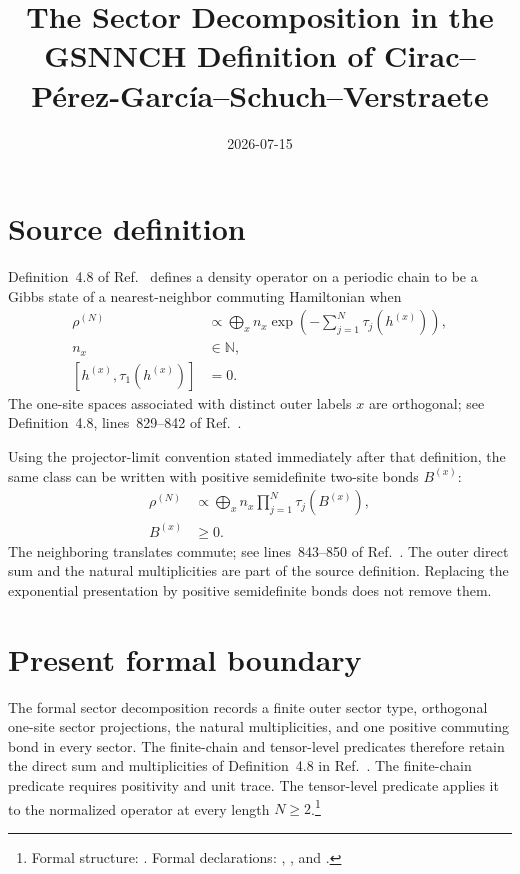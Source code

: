 \documentclass{article}
\title{The Sector Decomposition in the GSNNCH Definition of
Cirac--P\'erez-Garc\'ia--Schuch--Verstraete}
\author{}
\date{2026-07-15}
\begin{document}
\maketitle
{}

\section{Source definition}

Definition~4.8 of Ref.~\cite{Cirac2016MPDO_arXiv} defines a density operator
on a periodic chain to be a Gibbs state of a nearest-neighbor commuting
Hamiltonian when
\begin{align}
    \rho^{(N)}
        &\propto
        \bigoplus_x n_x
        \exp\left(-\sum_{j=1}^N\tau_j(h^{(x)})\right),
    \label{eq:cpsv16_gsnnch_sector_decomposition_source_exponential_form}\\
    n_x
        &\in\mathbb N,
    \label{eq:cpsv16_gsnnch_sector_decomposition_source_natural_multiplicity}\\
    [h^{(x)},\tau_1(h^{(x)})]
        &=0.
    \label{eq:cpsv16_gsnnch_sector_decomposition_source_local_commutation}
\end{align}
The one-site spaces associated with distinct outer labels $x$ are orthogonal;
see Definition~4.8, lines~829--842 of
Ref.~\cite{Cirac2016MPDO_arXiv}.

Using the projector-limit convention stated immediately after that definition,
the same class can be written with positive semidefinite two-site bonds
$B^{(x)}$:
\begin{align}
    \rho^{(N)}
        &\propto
        \bigoplus_x n_x
        \prod_{j=1}^N\tau_j(B^{(x)}),
    \label{eq:cpsv16_gsnnch_sector_decomposition_source_bond_product_form}\\
    B^{(x)}
        &\geq0.
    \label{eq:cpsv16_gsnnch_sector_decomposition_source_positive_bond}
\end{align}
The neighboring translates commute; see lines~843--850 of
Ref.~\cite{Cirac2016MPDO_arXiv}. The outer direct sum and the natural
multiplicities are part of the source definition. Replacing the exponential
presentation by positive semidefinite bonds does not remove them.

\section{Present formal boundary}

The formal sector decomposition records a finite outer sector type, orthogonal
one-site sector projections, the natural multiplicities, and one positive
commuting bond in every sector. The finite-chain and tensor-level predicates
therefore retain the direct sum and multiplicities of Definition~4.8 in
Ref.~\cite{Cirac2016MPDO_arXiv}. The finite-chain predicate requires positivity
and unit trace. The tensor-level predicate applies it to the normalized
operator at every length $N\geq2$.\footnote{\raggedright Formal structure:
. Formal declarations:
, , and
.}
\end{document}
